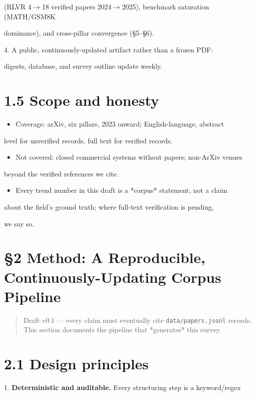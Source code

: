 \documentclass[11pt]{article}
\begin{document}
(RLVR 4$\rightarrow$18 verified papers 2024$\rightarrow$2025), benchmark saturation (MATH/GSM8K

dominance), and cross-pillar convergence (\S5--\S6).

4. A public, continuously-updated artifact rather than a frozen PDF:

digests, database, and survey outline update weekly.


\section{1.5 Scope and honesty}

\begin{itemize}
\item Coverage: arXiv, six pillars, 2023 onward; English-language, abstract
\end{itemize}
level for unverified records, full text for verified records.

\begin{itemize}
\item Not covered: closed commercial systems without papers; non-ArXiv venues
\end{itemize}
beyond the verified references we cite.

\begin{itemize}
\item Every trend number in this draft is a *corpus* statement, not a claim
\end{itemize}
about the field's ground truth; where full-text verification is pending,

we say so.



\section*{\S2 Method: A Reproducible, Continuously-Updating Corpus Pipeline}

\begin{quote}Draft v0.1 --- every claim must eventually cite \texttt{data/papers.jsonl} records. This section documents the pipeline that *generates* this survey.\end{quote}

\section{2.1 Design principles}

1. \textbf{Deterministic and auditable.} Every structuring step is a keyword/regex
\end{document}
